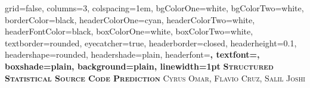 \documentclass[landscape,final,a0paper,fontscale=0.297]{baposter}
\begin{document}

\begin{poster}%
  {
  grid=false,
  columns=3,
  colspacing=1em,
  bgColorOne=white,
  bgColorTwo=white,
  borderColor=black,
  headerColorOne=cyan,
  headerColorTwo=white,
  headerFontColor=black,
  boxColorOne=white,
  boxColorTwo=white,
  textborder=rounded,
  eyecatcher=true,
  headerborder=closed,
  headerheight=0.1\textheight,
  headershape=rounded,
  headershade=plain,
  headerfont=\Large\bf\textsc, %
  textfont={\setlength{\parindent}{1.5em}},
  boxshade=plain,
  background=plain,
  linewidth=1pt
  }
  {} 
  {\bf\textsc{Structured Statistical Source Code Prediction}\vspace{0.5em}}
  {\textsc{Cyrus Omar, Flavio Cruz, Salil Joshi}}
  {}

\newcommand{\asgn}{\textbf{assignment}}
\newcommand{\statement}{\textbf{statement}}
\newcommand{\argument}{\textbf{argument}}
\newcommand{\other}{\textbf{other}}

\newcommand{\lit}{\textbf{lit}}
\newcommand{\meth}{\textbf{meth}}
\newcommand{\var}{\textbf{var}}

\newcommand{\nm}[1]{\#\{#1\}}


\end{poster}
\end{document}

